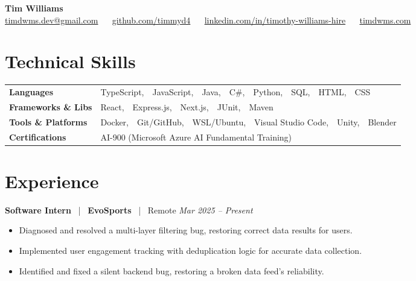 \documentclass[10pt, letterpaper]{article}
\newcommand{\jobhead}[4]{%
  \vspace{5pt}%
  {\bfseries\color{dark}#1}%
  ~{\color{light}|}~%
  {\bfseries\color{navy}#2}%
  ~{\color{light}|}~%
  {\color{light}#3}%
  \hfill{\color{light}\small\textit{#4}}\\[-2pt]%
}
\newcommand{\skillrow}[2]{%
  {\bfseries #1} & #2 \\[2pt]%
}
\begin{document}

\begin{center}
  {\huge\bfseries\color{navy} Tim Williams}\\[4pt]
  {\small\color{light}
    \href{mailto:timdwms.dev@gmail.com}{timdwms.dev@gmail.com}
    ~\textbullet~
    \href{https://github.com/timmyd4}{github.com/timmyd4}
    ~\textbullet~
    \href{https://www.linkedin.com/in/timothy-williams-hire}{linkedin.com/in/timothy-williams-hire}
    ~\textbullet~
    \href{https://timdwms.com}{timdwms.com}
  }
\end{center}

\vspace{2pt}

\section{Technical Skills}

\begin{tabular}{@{}p{1.6in} p{5.2in}@{}}
  \skillrow{Languages}{TypeScript,\ \ JavaScript,\ \ Java,\ \ C\#,\ \ Python,\ \ SQL,\ \ HTML,\ \ CSS}
  \skillrow{Frameworks \& Libs}{React,\ \ Express.js,\ \ Next.js,\ \ JUnit,\ \ Maven}
  \skillrow{Tools \& Platforms}{Docker,\ \ Git/GitHub,\ \ WSL/Ubuntu,\ \ Visual Studio Code,\ \ Unity,\ \ Blender}
  \skillrow{Certifications}{AI-900 (Microsoft Azure AI Fundamental Training)}
\end{tabular}

\section{Experience}

\jobhead{Software Intern}{EvoSports}{Remote}{Mar 2025 – Present}
\begin{itemize}
  \item Diagnosed and resolved a multi-layer filtering bug, restoring correct data results for users.
  \item Implemented user engagement tracking with deduplication logic for accurate data collection.
  \item Identified and fixed a silent backend bug, restoring a broken data feed's reliability.
\end{itemize}
\end{document}
